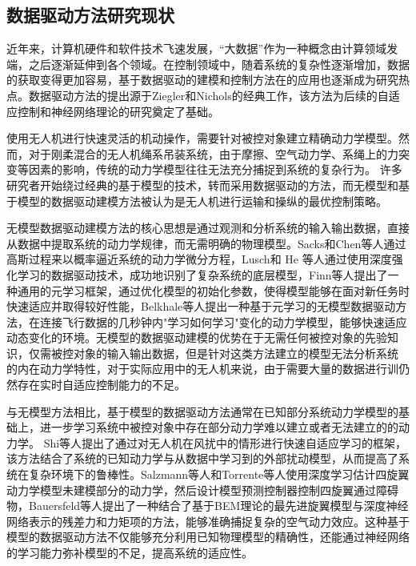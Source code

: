 \documentclass[lang=chs, degree=master, blindreview=false, winfonts=true]{yanputhesis}
\begin{document}



\subsection{数据驱动方法研究现状}
近年来，计算机硬件和软件技术飞速发展，“大数据”作为一种概念由计算领域发端，之后逐渐延伸到各个领域。在控制领域中，随着系统的复杂性逐渐增加，数据的获取变得更加容易，基于数据驱动的建模和控制方法在的应用也逐渐成为研究热点。数据驱动方法的提出源于Ziegler和Nichols的经典工作\cite{ziegler1942optimum}，该方法为后续的自适应控制\cite{wittenmark1989adaptive}和神经网络理论\cite{werbos1989neural}的研究奠定了基础。

使用无人机进行快速灵活的机动操作，需要针对被控对象建立精确动力学模型。然而，对于刚柔混合的无人机绳系吊装系统，由于摩擦、空气动力学、系绳上的力突变等因素的影响，传统的动力学模型往往无法充分捕捉到系统的复杂行为。
许多研究者开始绕过经典的基于模型的技术，转而采用数据驱动的方法\cite{hou2013model}，而无模型和基于模型的数据驱动建模方法被认为是无人机进行运输和操纵的最优控制策略。

无模型数据驱动建模方法的核心思想是通过观测和分析系统的输入输出数据，直接从数据中提取系统的动力学规律，而无需明确的物理模型。Sacks和Chen等人\cite{sacks2023learning,chen2022gaussian}通过高斯过程来以概率逼近系统的动力学微分方程，Lusch和 He 等人\cite{lusch2018deep,hewing2019cautious}通过使用深度强化学习的数据驱动技术，成功地识别了复杂系统的底层模型，Finn等人\cite{finn2017model}提出了一种通用的元学习框架，通过优化模型的初始化参数，使得模型能够在面对新任务时快速适应并取得较好性能，Belkhale等人\cite{belkhale2021model}提出一种基于元学习的无模型数据驱动方法，在连接飞行数据的几秒钟内"学习如何学习"变化的动力学模型，能够快速适应动态变化的环境。无模型的数据驱动建模的优势在于无需任何被控对象的先验知识，仅需被控对象的输入输出数据，但是针对这类方法建立的模型无法分析系统 的内在动力学特性，对于实际应用中的无人机来说，由于需要大量的数据进行训仍然存在实时自适应控制能力的不足。


与无模型方法相比，基于模型的数据驱动方法通常在已知部分系统动力学模型的基础上，进一步学习系统中被控对象中存在部分动力学难以建立或者无法建立的的动力学。
Shi等人\cite{o2022neural}提出了通过对无人机在风扰中的情形进行快速自适应学习的框架，该方法结合了系统的已知动力学与从数据中学习到的外部扰动模型，从而提高了系统在复杂环境下的鲁棒性。Salzmann等人\cite{salzmann2023real}和Torrente等人\cite{torrente2021data}使用深度学习估计四旋翼动力学模型未建模部分的动力学，然后设计模型预测控制器控制四旋翼通过障碍物，Bauersfeld等人\cite{Bauersfeld2021}提出了一种结合了基于BEM理论的最先进旋翼模型与深度神经网络表示的残差力和力矩项的方法，能够准确捕捉复杂的空气动力效应。这种基于模型的数据驱动方法不仅能够充分利用已知物理模型的精确性，还能通过神经网络的学习能力弥补模型的不足，提高系统的适应性。
\end{document}
